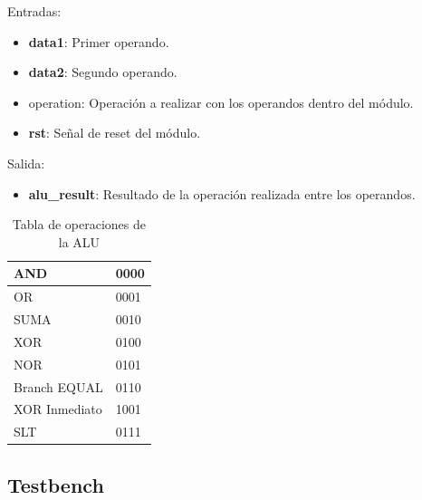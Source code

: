 Entradas:

\begin{itemize}
  \item \textbf{data1}: Primer operando.
  \item \textbf{data2}: Segundo operando.
  \item operation: Operaci\'on a realizar con los operandos dentro del m\'odulo.
  \item \textbf{rst}: Señal de reset del m\'odulo.
\end{itemize}

Salida:

\begin{itemize}
  \item \textbf{alu\_result}: Resultado de la operaci\'on realizada entre los operandos.
\end{itemize}

\begin{center}
\begin{table}[H]
\scriptsize
\centering
\begin{tabular}[\textwidth]{|l|l|}
\hline
AND & 0000\\
\hline
OR & 0001\\
\hline
SUMA & 0010\\
\hline
XOR & 0100\\
\hline
NOR & 0101\\
\hline
Branch EQUAL & 0110\\
\hline
XOR Inmediato & 1001\\
\hline
SLT & 0111\\
\hline
\end{tabular}
\center
\caption{Tabla de operaciones de la ALU}
\label{tab:test1}
\end{table}
\end{center}

\subsection{Testbench}